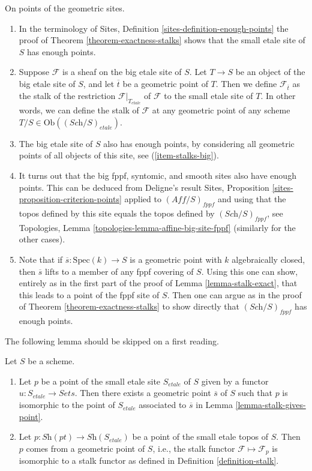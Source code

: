 \begin{remarks}
\label{remarks-enough-points}
On points of the geometric sites.
\begin{enumerate}
\item In the terminology of
Sites, Definition \ref{sites-definition-enough-points}
the proof of
Theorem \ref{theorem-exactness-stalks}
shows that the small etale site of $S$ has enough points.
\item Suppose $\mathcal{F}$ is a sheaf on the big etale site
\label{item-stalks-big}
of $S$. Let $T \to S$ be an object of the big etale site of $S$,
and let $\overline{t}$ be a geometric point of $T$. Then we define
$\mathcal{F}_{\overline{t}}$ as the stalk
of the restriction $\mathcal{F}|_{T_{etale}}$ of $\mathcal{F}$
to the small etale site of $T$. In other words, we can define
the stalk of $\mathcal{F}$ at any geometric point of any
scheme $T/S \in \text{Ob}((\textit{Sch}/S)_{etale})$.
\item The big etale site of $S$ also has enough points, by
considering all geometric points of all objects of this site, see
(\ref{item-stalks-big}).
\item It turns out that the big fppf, syntomic, and smooth sites also have
enough points. This can be deduced from Deligne's result
Sites, Proposition \ref{sites-proposition-criterion-points}
applied to $(\textit{Aff}/S)_{fppf}$ and using that the topos defined by
this site equals the topos defined by $(\textit{Sch}/S)_{fppf}$, see
Topologies, Lemma \ref{topologies-lemma-affine-big-site-fppf}
(similarly for the other cases).
\item Note that if $\overline{s} : \text{Spec}(k) \to S$ is a geometric
point with $k$ algebraically closed, then $\overline{s}$ lifts
to a member of any fppf covering of $S$. Using this one can show, entirely
as in the first part of the proof of
Lemma \ref{lemma-stalk-exact},
that this leads to a point of the fppf site of $S$.
Then one can argue as in the proof of
Theorem \ref{theorem-exactness-stalks}
to show directly that $(\textit{Sch}/S)_{fppf}$ has enough points.
\end{enumerate}
\end{remarks}

\noindent
The following lemma should be skipped on a first reading.

\begin{lemma}
\label{lemma-points-small-etale-site}
Let $S$ be a scheme.
\begin{enumerate}
\item Let $p$ be a point of the small etale site
$S_{etale}$ of $S$ given by a functor $u : S_{etale} \to \textit{Sets}$.
Then there exists a geometric point $\overline{s}$ of $S$ such that
$p$ is isomorphic to the point of $S_{etale}$ associated to $\overline{s}$ in
Lemma \ref{lemma-stalk-gives-point}.
\item Let $p : \textit{Sh}(pt) \to \textit{Sh}(S_{etale})$ be a point
of the small etale topos of $S$. Then $p$ comes from a geometric point
of $S$, i.e., the stalk functor $\mathcal{F} \mapsto \mathcal{F}_p$
is isomorphic to a stalk functor as defined in
Definition \ref{definition-stalk}.
\end{enumerate}
\end{lemma}

